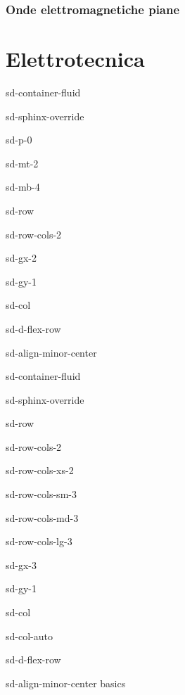 \documentclass[letterpaper,10pt,italian]{jupyterBook}
\begin{document}
\section{Onde elettromagnetiche piane}
\label{\detokenize{ch/waves-plane:onde-elettromagnetiche-piane}}\label{\detokenize{ch/waves-plane:classical-electromagnetism-waves-plane-waves}}\label{\detokenize{ch/waves-plane::doc}}
\sphinxstepscope


\part{Elettrotecnica}

\sphinxstepscope

\begin{sphinxuseclass}{sd-container-fluid}
\begin{sphinxuseclass}{sd-sphinx-override}
\begin{sphinxuseclass}{sd-p-0}
\begin{sphinxuseclass}{sd-mt-2}
\begin{sphinxuseclass}{sd-mb-4}
\begin{sphinxuseclass}{sd-row}
\begin{sphinxuseclass}{sd-row-cols-2}
\begin{sphinxuseclass}{sd-gx-2}
\begin{sphinxuseclass}{sd-gy-1}
\begin{sphinxuseclass}{sd-col}
\begin{sphinxuseclass}{sd-d-flex-row}
\begin{sphinxuseclass}{sd-align-minor-center}
\begin{sphinxuseclass}{sd-container-fluid}
\begin{sphinxuseclass}{sd-sphinx-override}
\begin{sphinxuseclass}{sd-row}
\begin{sphinxuseclass}{sd-row-cols-2}
\begin{sphinxuseclass}{sd-row-cols-xs-2}
\begin{sphinxuseclass}{sd-row-cols-sm-3}
\begin{sphinxuseclass}{sd-row-cols-md-3}
\begin{sphinxuseclass}{sd-row-cols-lg-3}
\begin{sphinxuseclass}{sd-gx-3}
\begin{sphinxuseclass}{sd-gy-1}
\begin{sphinxuseclass}{sd-col}
\begin{sphinxuseclass}{sd-col-auto}
\begin{sphinxuseclass}{sd-d-flex-row}
\begin{sphinxuseclass}{sd-align-minor-center}
\sphinxAtStartPar
basics


\end{sphinxuseclass}
\end{sphinxuseclass}
\end{sphinxuseclass}
\end{sphinxuseclass}
\end{sphinxuseclass}
\end{sphinxuseclass}
\end{sphinxuseclass}
\end{sphinxuseclass}
\end{sphinxuseclass}
\end{sphinxuseclass}
\end{sphinxuseclass}
\end{sphinxuseclass}
\end{sphinxuseclass}
\end{sphinxuseclass}
\end{sphinxuseclass}
\end{sphinxuseclass}
\end{sphinxuseclass}
\end{sphinxuseclass}
\end{sphinxuseclass}
\end{sphinxuseclass}
\end{sphinxuseclass}
\end{sphinxuseclass}
\end{sphinxuseclass}
\end{sphinxuseclass}
\end{sphinxuseclass}
\end{sphinxuseclass}
\end{document}
